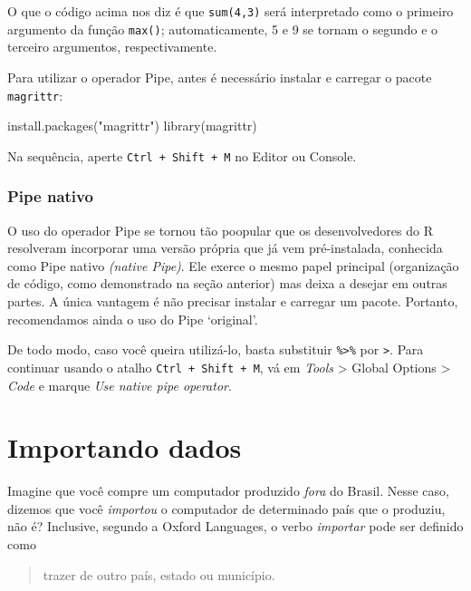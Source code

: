 \documentclass[
  letterpaper,
  DIV=11,
  numbers=noendperiod]{scrreprt}
\newenvironment{Shaded}{\begin{snugshade}}{\end{snugshade}}
\newcommand{\FunctionTok}[1]{\textcolor[rgb]{0.28,0.35,0.67}{#1}}
\newcommand{\NormalTok}[1]{\textcolor[rgb]{0.00,0.23,0.31}{#1}}
\newcommand{\StringTok}[1]{\textcolor[rgb]{0.13,0.47,0.30}{#1}}
\begin{document}
O que o código acima nos diz é que \texttt{sum(4,3)} será interpretado
como o primeiro argumento da função \texttt{max()}; automaticamente, 5 e
9 se tornam o segundo e o terceiro argumentos, respectivamente.

Para utilizar o operador Pipe, antes é necessário instalar e carregar o
pacote \texttt{magrittr}:

\begin{Shaded}
\begin{Highlighting}[]
\FunctionTok{install.packages}\NormalTok{(}\StringTok{"magrittr"}\NormalTok{)}
\FunctionTok{library}\NormalTok{(magrittr)}
\end{Highlighting}
\end{Shaded}

Na sequência, aperte \texttt{Ctrl\ +\ Shift\ +\ M} no Editor ou Console.

\subsection{Pipe nativo}\label{pipe-nativo}

O uso do operador Pipe se tornou tão poopular que os desenvolvedores do
R resolveram incorporar uma versão própria que já vem pré-instalada,
conhecida como Pipe nativo \emph{(native Pipe)}. Ele exerce o mesmo
papel principal (organização de código, como demonstrado na seção
anterior) mas deixa a desejar em outras partes. A única vantagem é não
precisar instalar e carregar um pacote. Portanto, recomendamos ainda o
uso do Pipe `original'.

De todo modo, caso você queira utilizá-lo, basta substituir
\texttt{\%\textgreater{}\%} por \texttt{\textbar{}\textgreater{}}. Para
continuar usando o atalho \texttt{Ctrl\ +\ Shift\ +\ M}, vá em
\emph{Tools} \textgreater{} Global Options \textgreater{} \emph{Code} e
marque \emph{Use native pipe operator}.

\chapter{Importando dados}\label{importando-dados}

Imagine que você compre um computador produzido \emph{fora} do Brasil.
Nesse caso, dizemos que você \emph{importou} o computador de determinado
país que o produziu, não é? Inclusive, segundo a Oxford Languages, o
verbo \emph{importar} pode ser definido como

\begin{quote}
trazer de outro país, estado ou município.
\end{quote}
\end{document}
